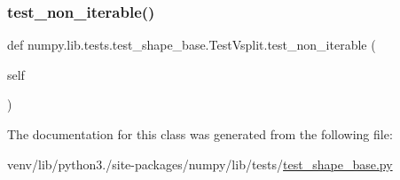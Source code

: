 \mbox{\label{classnumpy_1_1lib_1_1tests_1_1test__shape__base_1_1TestVsplit_ab7614e7c25738b54771dc34b8e413fbf}} 
\subsubsection{\texorpdfstring{test\+\_\+non\+\_\+iterable()}{test\_non\_iterable()}}
{\footnotesize\ttfamily def numpy.\+lib.\+tests.\+test\+\_\+shape\+\_\+base.\+Test\+Vsplit.\+test\+\_\+non\+\_\+iterable (\begin{DoxyParamCaption}\item[{}]{self }\end{DoxyParamCaption})}



The documentation for this class was generated from the following file\+:\begin{DoxyCompactItemize}
\item 
venv/lib/python3./site-\/packages/numpy/lib/tests/\hyperlink{lib_2tests_2test__shape__base_8py}{test\+\_\+shape\+\_\+base.\+py}\end{DoxyCompactItemize}
